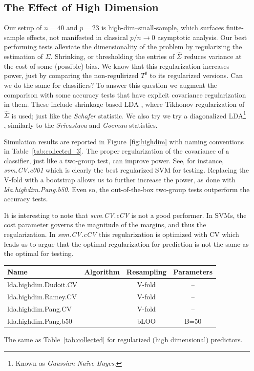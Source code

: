 \documentclass[onecolumn,draftclsnofoot]{IEEEtran}
\begin{document}
\subsection{The Effect of High Dimension}
\label{sec:highdim}

Our setup of $n=40$ and $p=23$ is high-dim--small-sample, which surfaces finite-sample effects, not manifested in classical $p/n \to 0$ asymptotic analysis.
Our best performing tests alleviate the dimensionality of the problem by regularizing the estimation of $\Sigma$. 
Shrinking, or thresholding the entries of $\hat{\Sigma}$ reduces variance at the cost of some (possible) bias. 
We know that this regularization increases power, just by comparing the non-regulirized $T^2$ to its regularized versions. 
Can we do the same for classifiers? 
To answer this question we augment the comparison with some accuracy tests that have explicit covariance regularization in them. 
These include shrinkage based LDA \cite{pang_shrinkage-based_2009,ramey_high-dimensional_2016}, where Tikhonov regularization of $\hat \Sigma$ is used; just like the \emph{Schafer} statistic.
We also try we try a diagonalized LDA\footnote{Known as \emph{Gaussian Na\"ive Bayes}.} \cite{dudoit_comparison_2002}, similarly to the \emph{Srivastava} and \emph{Goeman} statistics.

Simulation results are reported in Figure~\ref{fig:highdim} with naming conventions in Table~\ref{tab:collected_3}.
The proper regularization of the covariance of a classifier, just like a two-group test, can improve power. 
See, for instance, \emph{svm.CV.c001} which is clearly the best regularized SVM for testing. 
Replacing the V-fold  with a bootstrap allows us to further increase the power, as done with \emph{lda.highdim.Pang.b50}.
Even so, the out-of-the-box two-group tests outperform the accuracy tests.

It is interesting to note that \emph{svm.CV.cCV} is not a good performer. 
In SVMs, the cost parameter governs the magnitude of the margins, and thus the regularization. 
In \emph{svm.CV.cCV} this regularization is optimized with CV which leads us to argue that the optimal regularization for prediction is not the same as the optimal for testing.

\bigskip

\begin{tcolorbox}
	\centering
	\footnotesize
	\begin{tabular}{l|c|c|c}
		Name & Algorithm & Resampling &  Parameters\\ 
		\hline
		\hline
		lda.highdim.Dudoit.CV & \cite{dudoit_comparison_2002} & V-fold & -- \\ 
		lda.highdim.Ramey.CV & \cite{ramey_high-dimensional_2016} & V-fold & -- \\ 
		lda.highdim.Pang.CV & \cite{pang_shrinkage-based_2009} & V-fold & -- \\ 
		lda.highdim.Pang.b50 & \cite{pang_shrinkage-based_2009} & bLOO 	 & B=50 \\ 
	\end{tabular} 
	\captionsetup{type=table}
	\caption{\footnotesize
		The same as Table~\ref{tab:collected} for regularized (high dimensional) predictors. 
	} 
	\label{tab:collected_3}
\end{tcolorbox}
\end{document}
